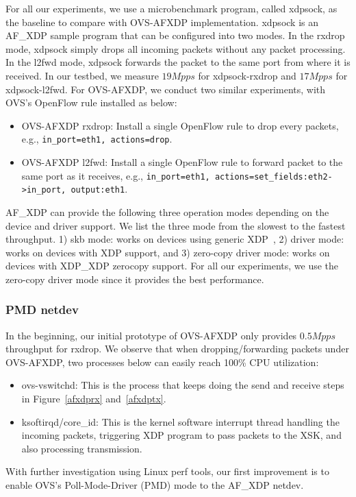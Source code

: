 \documentclass[10pt,numbers,reprint]{sigplanconf}
\newcommand{\mycomment}[1]{}
\begin{document}
For all our experiments, we use a microbenchmark program, called xdpsock,
as the baseline to compare with OVS-AFXDP implementation.
xdpsock is an AF\_XDP sample program that can be configured into two modes.
In the rxdrop mode, xdpsock simply drops all incoming packets without any
packet processing. In the l2fwd mode, xdpsock forwards the packet to the
same port from where it is received.
In our testbed, we measure $19Mpps$ for xdpsock-rxdrop and $17Mpps$ for xdpsock-l2fwd.
For OVS-AFXDP, we conduct two similar experiments, with OVS's OpenFlow rule installed as
below:
\begin{itemize}
\item OVS-AFXDP rxdrop: Install a single OpenFlow rule to drop every packets,
e.g.,  \texttt{in\_port=eth1, actions=drop}.
\item OVS-AFXDP l2fwd: Install a single OpenFlow rule to forward packet to the same port
as it receives, e.g., \texttt{in\_port=eth1, actions=set\_fields:eth2->in\_port, output:eth1}.
\end{itemize}

AF\_XDP can provide the following three operation modes depending on the device
and driver support. We list the three mode from the slowest to the fastest
throughput.
1) skb mode: works on devices using generic XDP~\cite{genericxdp},
2) driver mode: works on devices with XDP support, and
3) zero-copy driver mode: works on devices with XDP\_XDP zerocopy support.
For all our experiments, we use the zero-copy driver mode since it provides the
best performance.

\subsubsection{PMD netdev}
In the beginning, our initial prototype of OVS-AFXDP only provides $0.5Mpps$
throughput for rxdrop.
We observe that when dropping/forwarding packets under OVS-AFXDP, two processes
below can easily reach 100\% CPU utilization:
\begin{itemize}
\item ovs-vswitchd: This is the process that keeps doing the send and receive steps
in Figure~\ref{afxdprx} and~\ref{afxdptx}.
\item ksoftirqd/core\_id: This is the kernel software interrupt thread handling the
incoming packets, triggering XDP program to pass packets to the XSK, and also
processing transmission.
\end{itemize}
\mycomment{Compared to xdpsock, ovs-vswitchd adds on top of it a umempool,
and packets parsing, lookup and action execution.}
With further investigation using Linux perf tools, our first improvement is
to enable OVS's Poll-Mode-Driver (PMD) mode to the AF\_XDP netdev.
\end{document}
